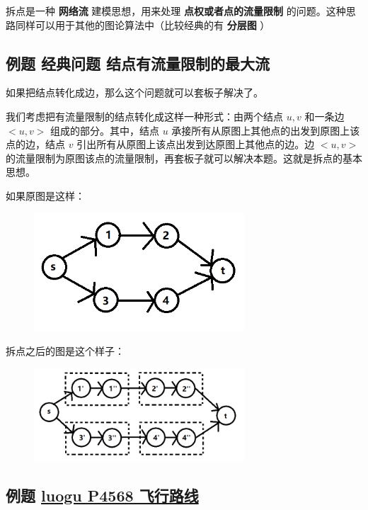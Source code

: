 
拆点是一种 \textbf{ 网络流 } 建模思想，用来处理 \textbf{点权或者点的流量限制} 的问题。这种思路同样可以用于其他的图论算法中（比较经典的有 \textbf{分层图} ）

\subsection{例题 经典问题 结点有流量限制的最大流}

如果把结点转化成边，那么这个问题就可以套板子解决了。

我们考虑把有流量限制的结点转化成这样一种形式：由两个结点 $u,v$ 和一条边 $<u,v>$ 组成的部分。其中，结点 $u$ 承接所有从原图上其他点的出发到原图上该点的边，结点 $v$ 引出所有从原图上该点出发到达原图上其他点的边。边 $<u,v>$ 的流量限制为原图该点的流量限制，再套板子就可以解决本题。这就是拆点的基本思想。

如果原图是这样：

\begin{figure}[htbp]
\centering
\includegraphics[width=0.7\textwidth]{docs/graph/flow/images/node1.png} 

\end{figure}

拆点之后的图是这个样子：

\begin{figure}[htbp]
\centering
\includegraphics[width=0.7\textwidth]{docs/graph/flow/images/node2.png} 
\end{figure}

\subsection{例题 \href{https://www.luogu.org/problemnew/show/P4568}{luogu P4568 飞行路线}}

